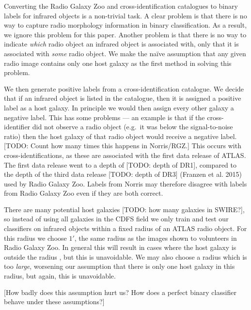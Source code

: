 \documentclass[fleqn,usenatbib,usedcolumn]{mnras}
\begin{document}
    Converting the Radio Galaxy Zoo and \citet{norris06} cross-identification
    catalogues to binary labels for infrared objects is a non-trivial task. A
    clear problem is that there is no way to capture radio morphology
    information in binary classification. As a result, we ignore this problem
    for this paper. Another problem is that there is no way to indicate
    \emph{which} radio object an infrared object is associated with, only that
    it is associated with \emph{some} radio object. We make the na\"ive
    assumption that any given radio image contains only one host galaxy as the
    first method in solving this problem.

    We then generate positive labels from a cross-identification catalogue.
    We decide that if an infrared object is listed in the catalogue, then it
    is assigned a positive label as a host galaxy. In principle we would
    then assign every other galaxy a negative label. This has some problems
    --- an example is that if the cross-identifier did not observe a radio
    object (e.g.~it was below the signal-to-noise ratio) then the host
    galaxy of that radio object would receive a negative label. {[}TODO:
    Count how many times this happens in Norris/RGZ.{]} This occurs with
    \citet{norris06} cross-identifications, as these are associated with
    the first data release of ATLAS. The first data release went to a depth
    of {[}TODO: depth of DR1{]}, compared to the depth of the third data
    release {[}TODO: depth of DR3{]} (Franzen et al. 2015) used by Radio
    Galaxy Zoo. Labels from Norris may therefore disagree with labels from
    Radio Galaxy Zoo even if they are both correct.

    There are many potential host galaxies {[}TODO: how many galaxies in
    SWIRE?{]}, so instead of using all galaxies in the CDFS field we only
    train and test our classifiers on infrared objects within a fixed radius
    of an ATLAS radio object. For this radius we choose \(1'\), the same
    radius as the images shown to volunteers in Radio Galaxy Zoo. In general
    this will result in cases where the host galaxy is outside the radius
    \citep[e.g. the giant radio galaxy shown in][]{banfield15}, but this is
    unavoidable. We may also choose a radius which is too \emph{large},
    worsening our assumption that there is only one host galaxy in this
    radius, but again, this is unavoidable.

    {[}How badly does this assumption hurt us? How does a perfect binary
    classifier behave under these assumptions?{]}
\end{document}
